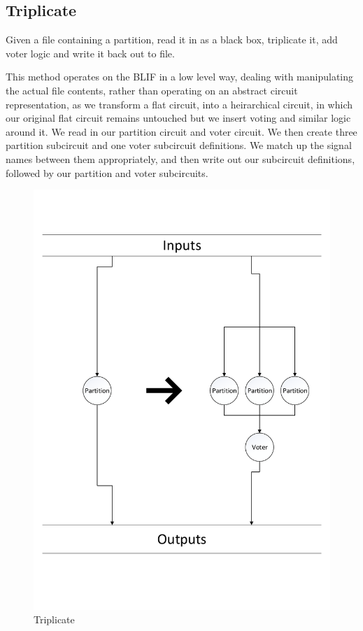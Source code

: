 \documentclass[12pt,final,oneside]{dwThesis} %
\begin{document}
\newpage

   \subsection{Triplicate}
   \label{algTriplicate} Given a file containing a
   partition, read it in as a black box, triplicate it, add voter logic and
   write it back out to file.

   This method operates on the \gls{BLIF} in a low level way, dealing with
   manipulating the actual file contents, rather than operating on an abstract
   circuit representation, as we transform a flat circuit, into a heirarchical
   circuit, in which our original flat circuit remains untouched but we insert
   voting and similar logic around it.  We read in our partition circuit and
   voter circuit. We then create three partition subcircuit and one voter
   subcircuit definitions. We match up the signal names between them
   appropriately, and then write out our subcircuit definitions, followed by
   our partition and voter subcircuits.


   \begin{figure}

      \begin{center}

         \includegraphics[width=\linewidth]{images/Triplicate.pdf}
         \caption{Triplicate} \label{imTriplicate} 
      \end{center}

   \end{figure}
\end{document}
